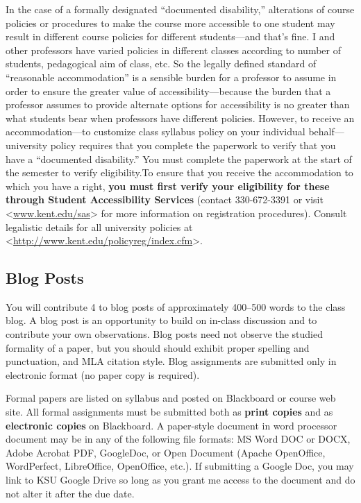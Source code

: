 \documentclass[]{article}
\begin{document}
In the case of a formally designated ``documented disability,''
alterations of course policies or procedures to make the course more
accessible to one student may result in different course policies for
different students---and that's fine. I and other professors have varied
policies in different classes according to number of students,
pedagogical aim of class, etc. So the legally defined standard of
``reasonable accommodation'' is a sensible burden for a professor to
assume in order to ensure the greater value of accessibility---because
the burden that a professor assumes to provide alternate options for
accessibility is no greater than what students bear when professors have
different policies. However, to receive an accommodation---to customize
class syllabus policy on your individual behalf---university policy
requires that you complete the paperwork to verify that you have a
``documented disability.'' You must complete the paperwork at the start
of the semester to verify eligibility.To ensure that you receive the
accommodation to which you have a right, \textbf{you must first verify
your eligibility for these through Student Accessibility Services}
(contact 330-672-3391 or visit
\textless{}\url{www.kent.edu/sas}\textgreater{} for more information on
registration procedures). Consult legalistic details for all university
policies at
\textless{}\url{http://www.kent.edu/policyreg/index.cfm}\textgreater{}.

\subsection{Blog Posts}\label{blog-posts}

You will contribute 4 to blog posts of approximately 400--500 words to
the class blog. A blog post is an opportunity to build on in-class
discussion and to contribute your own observations. Blog posts need not
observe the studied formality of a paper, but you should should exhibit
proper spelling and punctuation, and MLA citation style. Blog
assignments are submitted only in electronic format (no paper copy is
required).

Formal papers are listed on syllabus and posted on Blackboard or course
web site. All formal assignments must be submitted both as \textbf{print
copies} and as \textbf{electronic copies} on Blackboard. A paper-style
document in word processor document may be in any of the following file
formats: MS Word DOC or DOCX, Adobe Acrobat PDF, GoogleDoc, or Open
Document (Apache OpenOffice, WordPerfect, LibreOffice, OpenOffice,
etc.). If submitting a Google Doc, you may link to KSU Google Drive so
long as you grant me access to the document and do not alter it after
the due date.
\end{document}
